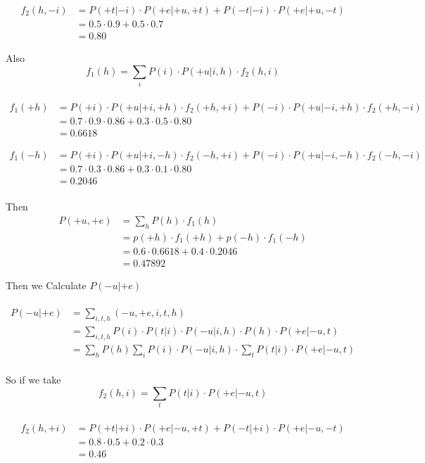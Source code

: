 \documentclass[]{article}
\begin{document}
\begin{equation} 
\begin{split}
f_2(h,-i) & = P(+t|-i)\cdot P(+e|+u,+t)+P(-t|-i)\cdot P(+e|+u,-t) \\
 & = 0.5\cdot 0.9+0.5\cdot 0.7 \\
 & = 0.80
\end{split}
\end{equation}

Also $$f_1(h) = \sum_{i}P(i) \cdot P(+u|i,h)\cdot f_2(h,i)$$ \\
\begin{equation} 
\begin{split}
f_1(+h) & = P(+i) \cdot P(+u|+i,+h)\cdot f_2(+h,+i)+P(-i) \cdot P(+u|-i,+h)\cdot f_2(+h,-i) \\
 & = 0.7\cdot 0.9\cdot 0.86+0.3\cdot 0.5\cdot 0.80 \\
 & = 0.6618
\end{split}
\end{equation}

\begin{equation} 
\begin{split}
f_1(-h) & = P(+i) \cdot P(+u|+i,-h)\cdot f_2(-h,+i)+P(-i) \cdot P(+u|-i,-h)\cdot f_2(-h,-i) \\
 & = 0.7\cdot 0.3\cdot 0.86+0.3\cdot 0.1\cdot 0.80 \\
 & = 0.2046
\end{split}
\end{equation}
\\
Then
\begin{equation} 
\begin{split}
P(+u,+e) & = \sum_{h}P(h)\cdot f_1(h) \\
 & = p(+h)\cdot f_1(+h) + p(-h)\cdot f_1(-h) \\
 & = 0.6\cdot 0.6618+0.4\cdot 0.2046 \\
 & = 0.47892
\end{split}
\end{equation}

Then we Calculate $P(-u|+e)$ \\\\

\begin{equation} 
\begin{split}
P(-u|+e) & = \sum_{i,t,h}(-u,+e,i,t,h) \\
 & = \sum_{i,t,h}P(i)\cdot P(t|i)\cdot P(-u|i,h)\cdot P(h)\cdot P(+e|-u,t) \\
 & = \sum_{h}P(h) \sum_{i}P(i) \cdot P(-u|i,h)\cdot \sum_{t}P(t|i)\cdot P(+e|-u,t)
\end{split}
\end{equation}
\\
So if we take $$f_2(h,i) = \sum_{t}P(t|i)\cdot P(+e|-u,t)$$ \\
\begin{equation} 
\begin{split}
f_2(h,+i) & = P(+t|+i)\cdot P(+e|-u,+t)+P(-t|+i)\cdot P(+e|-u,-t) \\
 & = 0.8\cdot 0.5+0.2\cdot 0.3 \\
 & = 0.46
\end{split}
\end{equation}
\end{document}

